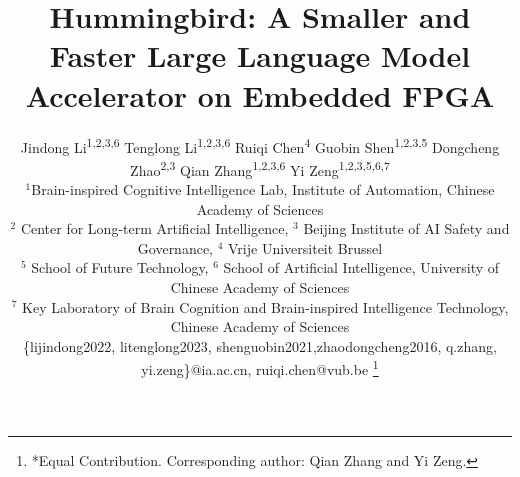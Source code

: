 \documentclass[conference]{IEEEtran}
\begin{document}

\title{Hummingbird: A Smaller and Faster Large Language Model Accelerator on Embedded FPGA}

\author{\normalsize
Jindong Li\textsuperscript{\scriptsize *1,2,3,6} \enspace
Tenglong Li\textsuperscript{\scriptsize *1,2,3,6} \enspace
Ruiqi Chen\textsuperscript{\scriptsize 4} \enspace
Guobin Shen\textsuperscript{\scriptsize 1,2,3,5} \enspace
Dongcheng Zhao\textsuperscript{\scriptsize 2,3} \enspace
Qian Zhang\textsuperscript{\scriptsize 1,2,3,6} \enspace
Yi Zeng\textsuperscript{\scriptsize 1,2,3,5,6,7}\\
$^1$Brain-inspired Cognitive Intelligence Lab, Institute of Automation, Chinese Academy of Sciences\\ 
$^2$ Center for Long-term Artificial Intelligence,
$^3$ Beijing Institute of AI Safety and Governance,
$^4$ Vrije Universiteit Brussel\\
$^5$ School of Future Technology,
$^6$ School of Artificial Intelligence, University of Chinese Academy of Sciences  \\ 
$^7$ Key Laboratory of Brain Cognition and Brain-inspired Intelligence Technology, Chinese Academy of Sciences\\ 
{\{lijindong2022, litenglong2023, shenguobin2021,}{zhaodongcheng2016, q.zhang, yi.zeng\}@ia.ac.cn, ruiqi.chen@vub.be}
\thanks{*Equal Contribution. Corresponding author: Qian Zhang and Yi Zeng.}
}

\maketitle
\end{document}

